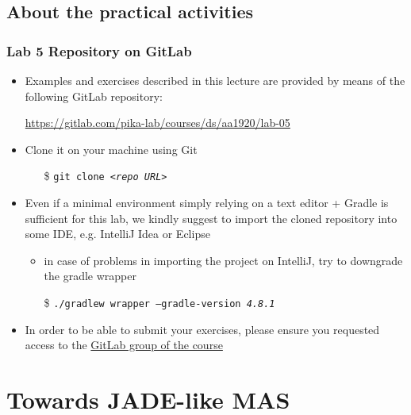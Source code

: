 \documentclass[presentation]{beamer}\mode<presentation>{\usetheme{AMSCesenaPurpleAndGold}}
\begin{document}
\subsection{About the practical activities}

\begin{frame}
\frametitle{Lab 5 Repository on GitLab}

	\begin{itemize}
		\item Examples and exercises described in this lecture are provided by means of the following GitLab repository:
		\begin{center}
			\url{https://gitlab.com/pika-lab/courses/ds/aa1920/lab-05}
		\end{center}
		
		\vfill
		
		\item Clone it on your machine using Git
		\begin{itemize}
		    \item[\$] \texttt{git clone \textit{<repo URL>}}
		\end{itemize}
		
		\vfill
		
		\item Even if a minimal environment simply relying on a text editor + Gradle is sufficient for this lab, we kindly suggest to import the cloned repository into some IDE, e.g. IntelliJ Idea or Eclipse
		\begin{itemize}
		    \item in case of problems in importing the project on IntelliJ, try to downgrade the gradle wrapper
		    \item[\$] \texttt{./gradlew wrapper \alert{--gradle-version \textit{4.8.1}}}
		\end{itemize}
		
		\vfill
		
		\item In order to be able to submit your exercises, please ensure you requested access to the \href{https://gitlab.com/pika-lab/courses/ds/aa1920}{GitLab group of the course}
	\end{itemize}

\end{frame}

\section{Towards JADE-like MAS}
\end{document}

